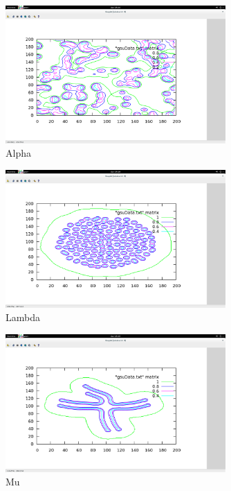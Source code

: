 \begin{figure}[tbh]
\begin{center}
\includegraphics[width=0.75\textwidth]{alpha.png}
\end{center}
\caption{Alpha\label{fig:gprun}}
\end{figure}

\begin{figure}[tbh]
\begin{center}
\includegraphics[width=0.75\textwidth]{lambda.png}
\end{center}
\caption{Lambda\label{fig:gprun}}
\end{figure}

\begin{figure}[tbh]
\begin{center}
\includegraphics[width=0.75\textwidth]{Mu.png}
\end{center}
\caption{Mu\label{fig:gprun}}
\end{figure}

